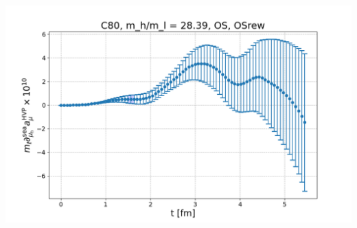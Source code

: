\documentclass[xcolor={dvipsnames,table}]{beamer}
\begin{document}
\begin{frame}
\begin{columns}
\begin{column}{0.5\textwidth}
      \includegraphics[trim=0cm 0.3cm 0cm 1.2cm, clip,width=\textwidth]{plots/der_mq_sea_lore/amu_C80_OS_der_028ml.png}
    \end{column}
  \end{columns}
\end{frame}
\end{document}
